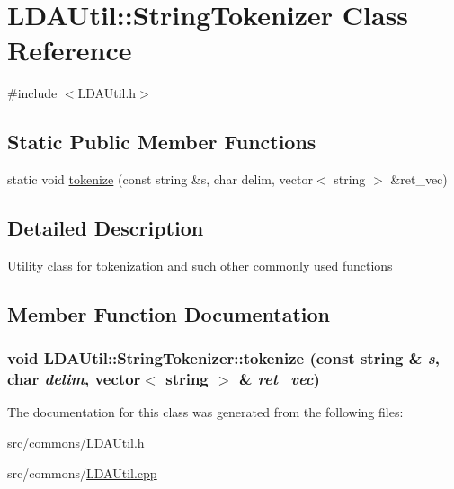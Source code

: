 \hypertarget{class_l_d_a_util_1_1_string_tokenizer}{
\section{LDAUtil::StringTokenizer Class Reference}
\label{class_l_d_a_util_1_1_string_tokenizer}
}


{\ttfamily \#include $<$LDAUtil.h$>$}

\subsection*{Static Public Member Functions}
\begin{DoxyCompactItemize}
\item 
static void \hyperlink{class_l_d_a_util_1_1_string_tokenizer_a4acb457766297aeda02b041a390daaee}{tokenize} (const string \&s, char delim, vector$<$ string $>$ \&ret\_\-vec)
\end{DoxyCompactItemize}


\subsection{Detailed Description}
Utility class for tokenization and such other commonly used functions 

\subsection{Member Function Documentation}
\hypertarget{class_l_d_a_util_1_1_string_tokenizer_a4acb457766297aeda02b041a390daaee}{
\subsubsection[{tokenize}]{\setlength{\rightskip}{0pt plus 5cm}void LDAUtil::StringTokenizer::tokenize (const string \& {\em s}, \/  char {\em delim}, \/  vector$<$ string $>$ \& {\em ret\_\-vec})}}
\label{class_l_d_a_util_1_1_string_tokenizer_a4acb457766297aeda02b041a390daaee}


The documentation for this class was generated from the following files:\begin{DoxyCompactItemize}
\item 
src/commons/\hyperlink{_l_d_a_util_8h}{LDAUtil.h}\item 
src/commons/\hyperlink{_l_d_a_util_8cpp}{LDAUtil.cpp}\end{DoxyCompactItemize}
